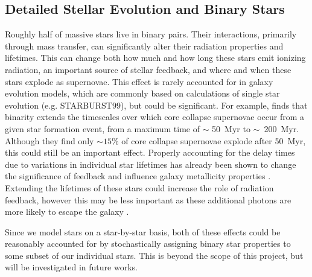 \documentclass[twocolumn]{aastex61}
\begin{document}
\subsection{Detailed Stellar Evolution and Binary Stars}
\label{sec:binary stars}

Roughly half of massive stars live in binary pairs. Their interactions, primarily through mass transfer, can significantly alter their radiation properties and lifetimes. This can change both how much and how long these stars emit ionizing radiation, an important source of stellar feedback, and where and when these stars explode as supernovae. This effect is rarely accounted for in galaxy evolution models, which are commonly based on calculations of single star evolution (e.g. STARBURST99), but could be significant. For example, \cite{Zapartas2017} finds that binarity extends the timescales over which core collapse supernovae occur from a given star formation event, from a maximum time of $\sim$ 50~Myr to $\sim$~200~Myr. Although they find only $\sim 15\%$ of core collapse supernovae explode after 50~Myr, this could still be an important effect. Properly accounting for the delay times due to variations in individual star lifetimes has already been shown to change the significance of feedback and influence galaxy metallicity properties \citep{Kimm2015}. Extending the lifetimes of these stars could increase the role of radiation feedback, however this may be less important as these additional photons are more likely to escape the galaxy \citep[e.g.][]{Ma2016-binary}. 

Since we model stars on a star-by-star basis, both of these effects could be reasonably accounted for by stochastically assigning binary star properties to some subset of our individual stars. This is beyond the scope of this project, but will be investigated in future works.
\end{document}
